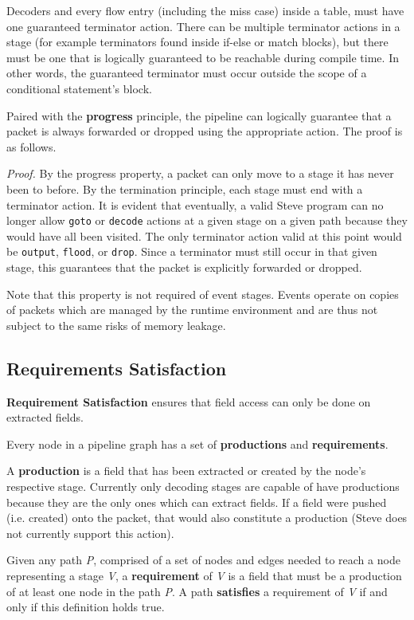 Decoders and every flow entry (including the miss case) inside a table, must have one guaranteed terminator action. There can be multiple terminator actions in a stage (for example terminators found inside if-else or match blocks), but there must be one that is logically guaranteed to be reachable during compile time. In other words, the guaranteed terminator must occur outside the scope of a conditional statement's block.

Paired with the \textbf{progress} principle, the pipeline can logically guarantee that a packet is always forwarded or dropped using the appropriate action. The proof is as follows.

\textit{Proof.} By the progress property, a packet can only move to a stage it has never been to before. By the termination principle, each stage must end with a terminator action. It is evident that eventually, a valid Steve program can no longer allow \texttt{goto} or \texttt{decode} actions at a given stage on a given path because they would have all been visited. The only terminator action valid at this point would be \texttt{output}, \texttt{flood}, or \texttt{drop}. Since a terminator must still occur in that given stage, this guarantees that the packet is explicitly forwarded or dropped.

Note that this property is not required of event stages. Events operate on copies of packets which are managed by the runtime environment and are thus not subject to the same risks of memory leakage.

\subsection{Requirements Satisfaction} \label{requirements_guide}

\textbf{Requirement Satisfaction} ensures that field access can only be done on extracted fields.

Every node in a pipeline graph has a set of \textbf{productions} and \textbf{requirements}.

A \textbf{production} is a field that has been extracted or created by the node's respective stage. Currently only decoding stages are capable of have productions because they are the only ones which can extract fields. If a field were pushed (i.e. created) onto the packet, that would also constitute a production (Steve does not currently support this action).

Given any path \textit{P}, comprised of a set of nodes and edges needed to reach a node representing a stage \textit{V}, a \textbf{requirement} of \textit{V} is a field that must be a production of at least one node in the path \textit{P}. A path \textbf{satisfies} a requirement of \textit{V} if and only if this definition holds true.

